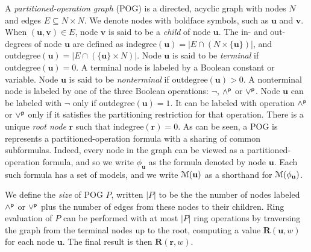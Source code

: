 \documentclass[letterpaper,USenglish,cleveref, autoref, thm-restate]{lipics-v2021}
\newcommand{\pand}{\mathbin{\land^{\sf p}}}
\newcommand{\por}{\mathbin{\lor^{\sf p}}}
\newcommand{\boolnot}{\neg}
\newcommand{\rep}{\textbf{R}}
\newcommand{\modelset}{{\cal M}}
\newcommand{\indegree}{\textrm{indegree}}
\newcommand{\outdegree}{\textrm{outdegree}}
\newcommand{\makenode}[1]{\mathbf{#1}}
\newcommand{\nodeu}{\makenode{u}}
\newcommand{\nodev}{\makenode{v}}
\newcommand{\noder}{\makenode{r}}
\begin{document}
A {\em partitioned-operation graph} (POG) is a directed, acyclic graph
with nodes $N$ and edges $E \subseteq N \times N$.  We denote nodes with boldface symbols, such as $\nodeu$ and $\nodev$.
When $(\nodeu,\nodev) \in E$,
node $\nodev$ is said to be a {\em child} of node $\nodeu$.
The in- and out-degrees of node $\nodeu$ are defined as $\indegree(\nodeu) = | E \cap (N \times \{\nodeu\}) |$, and
$\outdegree(\nodeu) = | E \cap (\{\nodeu\} \times N) |$.
Node $\nodeu$ is said to be {\em terminal} if $\outdegree(\nodeu) = 0$.  A terminal node is labeled by a Boolean constant or variable.
Node $\nodeu$ is said to be {\em nonterminal} if $\outdegree(\nodeu) > 0$.
A nonterminal node is labeled by one of the three Boolean operations: $\boolnot$, $\pand$ or $\por$.
Node $\nodeu$ can be labeled with $\boolnot$ only if $\outdegree(\nodeu) = 1$.
It can be labeled with operation $\pand$ or $\por$ only if it satisfies the partitioning restriction for that operation.
There is a unique {\em root node} $\noder$ such that $\indegree(\noder) = 0$.
As can be seen, a POG is represents a partitioned-operation
formula with a sharing of common subformulas.  Indeed, every node in the graph can be viewed as a partitioned-operation formula, and so we write
$\phi_{\nodeu}$ as the formula denoted by node $\nodeu$.
Each such formula has a set of models, and we write $\modelset(\nodeu)$ as a shorthand for $\modelset(\phi_{\nodeu})$.

We define the {\em size} of POG $P$, written $|P|$ to be the
the number of nodes labeled $\pand$ or $\por$ plus the number of edges from these nodes to their children.  Ring
evaluation of $P$ can be performed with at most $|P|$ ring
operations by traversing the graph from the terminal nodes up to
the root, computing a value $\rep(\nodeu, w)$ for each node $\nodeu$.
The final result is then $\rep(\noder, w)$.
\end{document}
